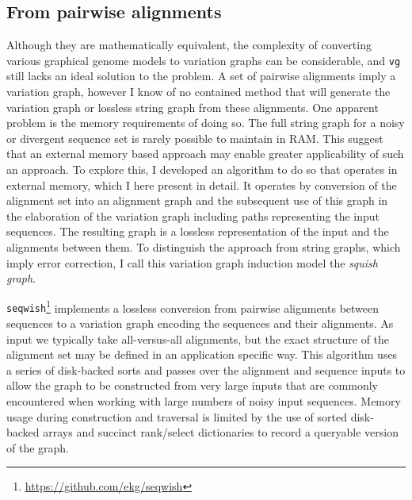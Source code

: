 \subsection{From pairwise alignments}
\label{sec:from_pairwise_alignments}

Although they are mathematically equivalent, the complexity of converting various graphical genome models to variation graphs can be considerable, and {\tt vg} still lacks an ideal solution to the problem.
A set of pairwise alignments imply a variation graph, however I know of no contained method that will generate the variation graph or lossless string graph from these alignments.
One apparent problem is the memory requirements of doing so.
The full string graph for a noisy or divergent sequence set is rarely possible to maintain in RAM.
This suggest that an external memory based approach may enable greater applicability of such an approach.
To explore this, I developed an algorithm to do so that operates in external memory, which I here present in detail.
It operates by conversion of the alignment set into an alignment graph and the subsequent use of this graph in the elaboration of the variation graph including paths representing the input sequences.
The resulting graph is a lossless representation of the input and the alignments between them.
To distinguish the approach from string graphs, which imply error correction, I call this variation graph induction model the \emph{squish graph}.

{\tt seqwish}\footnote{\url{https://github.com/ekg/seqwish}} implements a lossless conversion from pairwise alignments between sequences to a variation graph encoding the sequences and their alignments.
As input we typically take all-versus-all alignments, but the exact structure of the alignment set may be defined in an application specific way.
This algorithm uses a series of disk-backed sorts and passes over the alignment and sequence inputs to allow the graph to be constructed from very large inputs that are commonly encountered when working with large numbers of noisy input sequences. 
Memory usage during construction and traversal is limited by the use of sorted disk-backed arrays and succinct rank/select dictionaries to record a queryable version of the graph.



